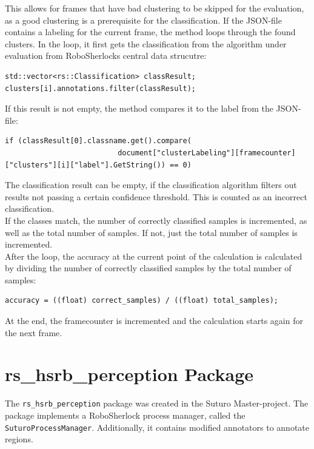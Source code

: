 \documentclass[main.tex]{subfiles}
\begin{document}
This allows for frames that have bad clustering to be skipped for the evaluation, as a good clustering is a prerequisite for the classification. If the JSON-file contains a labeling for the current frame, the method loops through the found clusters. In the loop, it first gets the classification from the algorithm under evaluation from RoboSherlocks central data strucutre:

\begin{lstlisting}
std::vector<rs::Classification> classResult;
clusters[i].annotations.filter(classResult);
\end{lstlisting}

If this result is not empty, the method compares it to the label from the JSON-file:

\begin{lstlisting}
if (classResult[0].classname.get().compare(
                          document["clusterLabeling"][framecounter]["clusters"][i]["label"].GetString()) == 0)
\end{lstlisting}

The classification result can be empty, if the classification algorithm filters out results not passing a certain confidence threshold. This is counted as an incorrect classification.\\

If the classes match, the number of correctly classified samples is incremented, as well as the total number of samples. If not, just the total number of samples is incremented.\\

After the loop, the accuracy at the current point of the calculation is calculated by dividing the number of correctly classified samples by the total number of samples:

\begin{lstlisting}
accuracy = ((float) correct_samples) / ((float) total_samples);
\end{lstlisting}

At the end, the framecounter is incremented and the calculation starts again for the next frame.

\section{rs\_hsrb\_perception Package}

The \texttt{rs\_hsrb\_perception} package was created in the Suturo Master-project. The package implements a RoboSherlock process manager, called the \texttt{SuturoProcessManager}. Additionally, it contains modified annotators to annotate regions.
\end{document}
